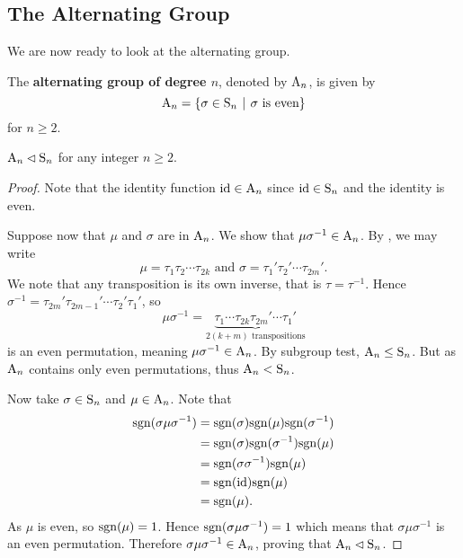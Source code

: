 \subsection{The Alternating Group}
We are now ready to look at the alternating group.
\begin{definition}
    The \textbf{alternating group of degree $n$}, denoted by $\mathrm{A}_{n}$, is given by
    \[
        \An{n} = \left\{\sigma \in \Sn{n} \vert \sigma \text{ is even}\right\}
    \]
    for $n \geq 2$.
\end{definition}

\begin{proposition}\label{prop-An-normal-subgroup-of-Sn}
    $\mathrm{A}_{n} \lhd \mathrm{S}_{n}$ for any integer $n \geq 2$.
\end{proposition}
\begin{proof}
    Note that the identity function $\mathrm{id} \in \mathrm{A}_{n}$ since $\mathrm{id} \in \mathrm{S}_{n}$ and the identity is even.

    Suppose now that $\mu$ and $\sigma$ are in $\mathrm{A}_{n}$. We show that $\mu\sigma^{-1} \in \mathrm{A}_{n}$. By , we may write
    \[
        \mu = \tau_1\tau_2\cdots\tau_{2k} \text{ and } \sigma = \tau_1'\tau_2'\cdots\tau_{2m}'.
    \]
    We note that any transposition is its own inverse, that is $\tau = \tau^{-1}$. Hence $\sigma^{-1} = \tau_{2m}'\tau_{2m-1}'\cdots\tau_2'\tau_1'$, so
    \[
        \mu\sigma^{-1} = \underbrace{\tau_1\cdots\tau_{2k}\tau_{2m}'\cdots\tau_1'}_{2(k+m) \text{ transpositions}}
    \]
    is an even permutation, meaning $\mu\sigma^{-1} \in \mathrm{A}_{n}$. By subgroup test, $\mathrm{A}_{n} \leq \mathrm{S}_{n}$. But as $\mathrm{A}_{n}$ contains only even permutations, thus $\mathrm{A}_{n} < \mathrm{S}_{n}$.

    Now take $\sigma \in \mathrm{S}_{n}$ and $\mu \in \mathrm{A}_{n}$. Note that
    \begin{align*}
        \mathrm{sgn}(\sigma\mu\sigma^{-1}) &= \mathrm{sgn}(\sigma)\mathrm{sgn}(\mu)\mathrm{sgn}(\sigma^{-1})\\
        &= \mathrm{sgn}(\sigma)\mathrm{sgn}(\sigma^{-1})\mathrm{sgn}(\mu)\\
        &= \mathrm{sgn}(\sigma\sigma^{-1})\mathrm{sgn}(\mu)\\
        &= \mathrm{sgn}(\mathrm{id})\mathrm{sgn}(\mu)\\
        &= \mathrm{sgn}(\mu).
    \end{align*}
    As $\mu$ is even, so $\mathrm{sgn}(\mu) = 1$. Hence $\mathrm{sgn}(\sigma\mu\sigma^{-1}) = 1$ which means that $\sigma\mu\sigma^{-1}$ is an even permutation. Therefore $\sigma\mu\sigma^{-1} \in \mathrm{A}_{n}$, proving that $\mathrm{A}_{n} \lhd \mathrm{S}_{n}$.
\end{proof}

